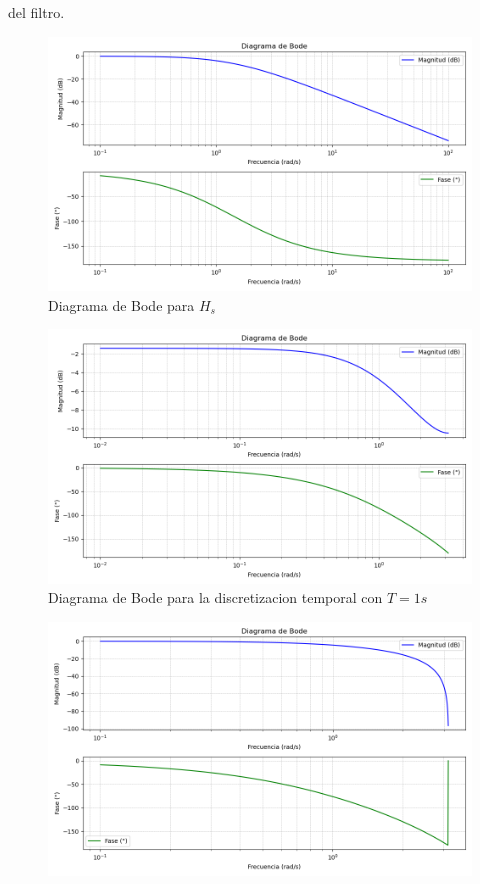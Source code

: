 \documentclass[a4paper,12pt]{report}
\begin{document}
\begin{enumerate}[label=\alph*), left=0pt]
                del filtro.\\
              \begin{figure}[H]
                \centering
                \includegraphics[width=1\linewidth]{./images/BodeHs.png}
                \caption{Diagrama de Bode para $H_s$}
              \end{figure}
              \begin{figure}[H]
                \centering
                \includegraphics[width=1\linewidth]{./images/BodeD1.png}
                \caption{Diagrama de Bode para la discretizacion temporal con $T=1s$}
              \end{figure}
              \begin{figure}[H]
                \centering
                \includegraphics[width=1\linewidth]{./images/BodeB1.png}

\end{figure}
\end{enumerate}
\end{document}
